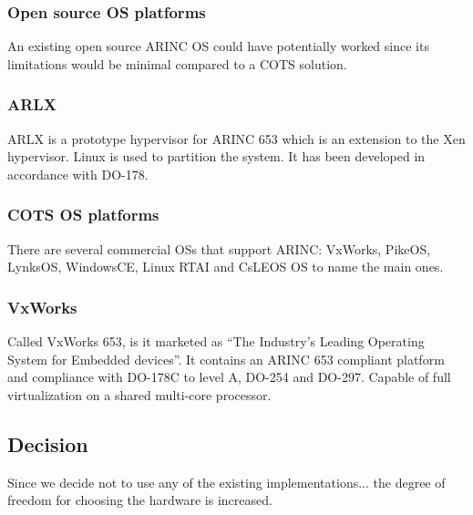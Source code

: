 \subsubsection{Open source OS platforms}
An existing open source ARINC OS could have potentially worked since its limitations would be minimal
compared to a COTS solution. %

\subsubsection{ARLX}
ARLX is a prototype hypervisor for ARINC 653 which is an extension to the Xen hypervisor.
Linux is used to partition the system.
It has been developed in accordance with DO-178.

\subsubsection{COTS OS platforms}
There are several commercial OSs that support ARINC:
VxWorks, PikeOS, LynksOS, WindowsCE, Linux RTAI and CsLEOS OS to name the main ones.

\subsubsection{VxWorks}
Called VxWorks 653, is it marketed as ``The Industry's Leading Operating System for Embedded devices''.
It contains an ARINC 653 compliant platform and compliance with DO-178C to level A, DO-254 and DO-297.
Capable of full virtualization on a shared multi-core processor.

\subsection{Decision}
Since we decide not to use any of the existing implementations...
the degree of freedom for choosing the hardware is increased.
\fi

